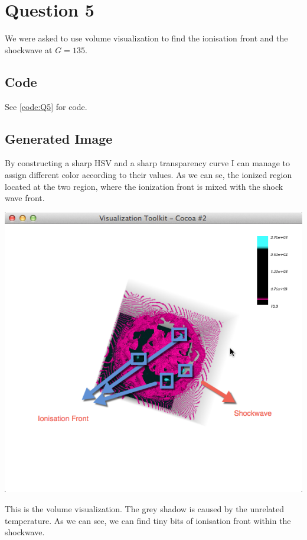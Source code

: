 \documentclass[11pt]{scrartcl}
\begin{document}
\section{Question 5}

We were asked to use volume visualization to find the ionisation front and the shockwave at $G = 135$. 

\subsection{Code}

See \ref{code:Q5} for code.\\


\subsection{Generated Image}

By constructing a sharp HSV and a sharp transparency curve I can manage to assign different color according to their values. As we can se, the ionized region located at the two region, where the ionization front is mixed with the shock wave front.\\


\begin{minipage}[t]{\linewidth}
{
\includegraphics[scale = 0.7]{img_5.png}

\centering
\medskip
{\footnotesize This is the volume visualization. The grey shadow is caused by the unrelated temperature. As we can see, we can find tiny bits of ionisation front within the shockwave.  }
}
\end{minipage}
\end{document}
